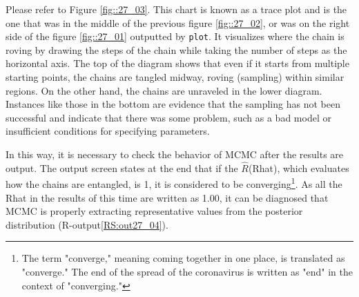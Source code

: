 \documentclass{ltjbook}
\begin{document}
Please refer to Figure \ref{fig::27_03}. This chart is known as a trace plot and is the one that was in the middle of the previous figure \ref{fig::27_02}, or was on the right side of the figure \ref{fig::27_01} outputted by \texttt{plot}. It visualizes where the chain is roving by drawing the steps of the chain while taking the number of steps as the horizontal axis. The top of the diagram shows that even if it starts from multiple starting points, the chains are tangled midway, roving (sampling) within similar regions. On the other hand, the chains are unraveled in the lower diagram. Instances like those in the bottom are evidence that the sampling has not been successful and indicate that there was some problem, such as a bad model or insufficient conditions for specifying parameters.

In this way, it is necessary to check the behavior of MCMC after the results are output. The output screen states at the end that if the $\hat{R}$(Rhat), which evaluates how the chains are entangled, is 1, it is considered to be converging\footnote{The term "converge," meaning coming together in one place, is translated as "converge." The end of the spread of the coronavirus is written as "end" in the context of "converging."}. As all the Rhat in the results of this time are written as 1.00, it can be diagnosed that MCMC is properly extracting representative values from the posterior distribution (R-output\ref{RS:out27_04}).
\end{document}
